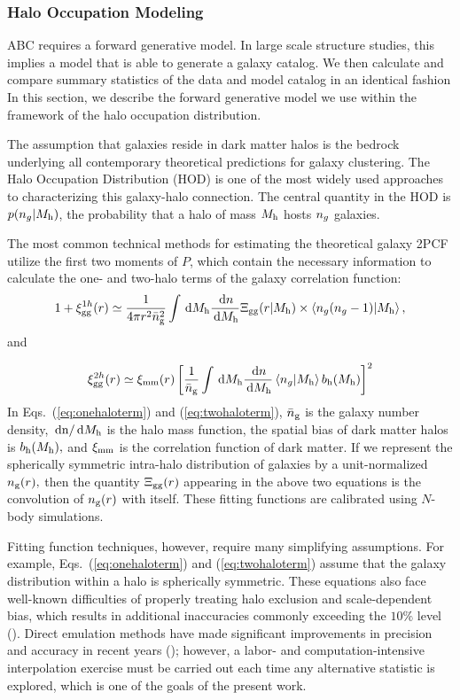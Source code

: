 \subsubsection{Halo Occupation Modeling}


ABC requires a forward generative model. In large scale structure studies, this implies a model
that is able to generate a galaxy catalog. We then calculate and compare summary statistics of the data and model catalog in an identical fashion
In this section, we describe the forward generative model we use within the framework of the 
halo occupation distribution.

The assumption that galaxies reside in dark matter halos is the bedrock underlying 
all contemporary theoretical predictions for galaxy clustering. The Halo Occupation Distribution 
(HOD) is one of the most widely used approaches to characterizing this galaxy-halo connection. 
The central quantity in the HOD is $p(n_{g}|M_{\rm h})$, the probability that a halo of mass 
$M_{\rm h}$ hosts $n_{g}$ galaxies. 

The most common technical methods for estimating the theoretical galaxy 2PCF utilize the 
first two moments of $P$, which contain the necessary information to calculate the one- 
and two-halo terms of the galaxy correlation function:
\begin{eqnarray}
\label{eq:onehaloterm}
1+\xi^{1h}_{\mathrm{gg}}(r) \simeq \frac{1}{4\pi{}r^{2}\bar{n}_{\mathrm{g}}^{2}}\int\,\mathrm{d}M_{\rm h}\frac{\,\mathrm{d} n}{\,\mathrm{d}M_{\rm h}}\Xi_{\rm gg}(r|M_{\rm h}) \times \left\langle n_{g}(n_{g}-1) \vert {M_{\rm h}}\right\rangle,
\end{eqnarray} and

\begin{eqnarray}
\label{eq:twohaloterm}
\xi^{2h}_{\mathrm{gg}}(r) \simeq \xi_{\mathrm{mm}}(r)\left[\frac{1}{\bar{n}_{\mathrm{g}}}\int\,\mathrm{d}M_{\rm h}\frac{\,\mathrm{d} n}{\,\mathrm{d}M_{\rm h}} \left\langle n_{g} \vert {M_{\rm h}}\right\rangle b_{\mathrm{h}}(M_{\rm h})\right]^{2}
\end{eqnarray}
In Eqs.~(\ref{eq:onehaloterm}) and (\ref{eq:twohaloterm}), $\bar{n}_{\mathrm{g}}$ is the galaxy number density,
$\,\mathrm{d}\mathrm{n}/\,\mathrm{d}M_{\rm h}$ is the halo mass function, the spatial bias of dark matter halos is 
$b_{\mathrm{h}}(M_{\rm h}),$ and $\xi_{\rm mm}$ is the correlation function of dark matter.  
If we represent the spherically symmetric intra-halo distribution of galaxies by a unit-normalized 
$n_{\rm g}(r),$ then the quantity $\Xi_{\rm gg}(r)$ appearing in the above two equations 
is the convolution of $n_{\rm g}(r)$ with itself. These fitting functions are calibrated using $N$-body 
simulations. 

Fitting function techniques, however, require many simplifying assumptions. For example, 
Eqs.~(\ref{eq:onehaloterm}) and (\ref{eq:twohaloterm}) assume that the galaxy 
distribution within a halo is spherically symmetric. These equations 
also face well-known difficulties of properly treating halo exclusion and scale-dependent bias, 
which results in additional inaccuracies commonly exceeding the $10\%$ level (\citealt{vdBosch13}). 
Direct emulation methods have made significant improvements in precision and accuracy in recent 
years (\citealt{coyote2,coyote1}); however, a labor- and computation-intensive interpolation 
exercise must be carried out each time any alternative statistic is explored, which is one of the goals of the present work.

